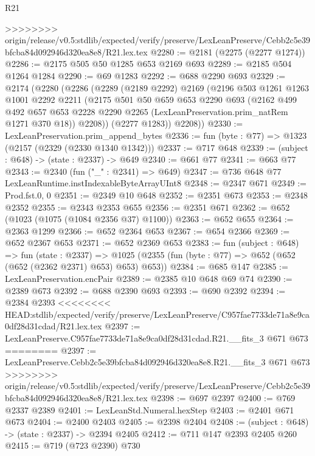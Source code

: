 \begin{lexlean}{R21}
\begin{coremodule}
{{{{{{{{{{{{{{{>>>>>>>> origin/release/v0.5:stdlib/expected/verify/preserve/LexLeanPreserve/Cebb2c5e39bfcba84d092946d320ea8e8/R21.lex.tex
@2280 := @2181 (@2275 (@2277 @1274))
@2286 := @2175 @505 @50 @1285 @653 @2169 @693
@2289 := @2185 @504 @1264 @1284
@2290 := @69 @1283
@2292 := @688 @2290 @693
@2329 := @2174
    (@2280
      (@2286
        (@2289
          (@2189 @2292)
          @2169
          (@2196
            @503
            @1261
            @1263
            @1001
            @2292
            @2211
            (@2175
              @501
              @50
              @659
              @653
              @2290
              @693
              (@2162
                @499
                @492
                @657
                @653
                @2228
                @2290
                @2265
                (LexLeanPreservation.prim_natRem @1271 @370 @18))
              @2208))
          (@2277 @1283))
        @2208))
@2330 := LexLeanPreservation.prim_append_bytes
@2336 := fun (byte : @77) => @1323 (@2157 (@2329 (@2330 @1340 @1342)))
@2337 := @717 @648
@2339 := (subject : @648) -> (state : @2337) -> @649
@2340 := @661 @77
@2341 := @663 @77
@2343 := @2340 (fun ("_" : @2341) => @649)
@2347 := @736 @648 @77 LexLeanRuntime.instIndexableByteArrayUInt8
@2348 := @2347 @671
@2349 := Prod.fst.{0, 0}
@2351 := @2349 @10 @648
@2352 := @2351 @673
@2353 := @2348 @2352
@2355 := @2343 @2353 @655
@2356 := @2351 @671
@2362 := @652 (@1023 (@1075 (@1084 @2356 @37) @1100))
@2363 := @652 @655
@2364 := @2363 @1299
@2366 := @652 @2364 @653
@2367 := @654 @2366
@2369 := @652 @2367 @653
@2371 := @652 @2369 @653
@2383 := fun (subject : @648) =>
  fun (state : @2337) =>
  @1025 (@2355 (fun (byte : @77) => @652 (@652 (@652 (@2362 @2371) @653) @653) @653))
@2384 := @685 @147
@2385 := LexLeanPreservation.encPair
@2389 := @2385 @10 @648 @69 @74
@2390 := @2389 @673
@2392 := @688 @2390 @693
@2393 := @690 @2392
@2394 := @2384 @2393
<<<<<<<< HEAD:stdlib/expected/verify/preserve/LexLeanPreserve/C957fae7733de71a8e9ca0df28d31cdad/R21.lex.tex
@2397 := LexLeanPreserve.C957fae7733de71a8e9ca0df28d31cdad.R21.__fits_3 @671 @673
========
@2397 := LexLeanPreserve.Cebb2c5e39bfcba84d092946d320ea8e8.R21.__fits_3 @671 @673
>>>>>>>> origin/release/v0.5:stdlib/expected/verify/preserve/LexLeanPreserve/Cebb2c5e39bfcba84d092946d320ea8e8/R21.lex.tex
@2398 := @697 @2397
@2400 := @769 @2337 @2389
@2401 := LexLeanStd.Numeral.hexStep
@2403 := @2401 @671 @673
@2404 := @2400 @2403
@2405 := @2398 @2404
@2408 := (subject : @648) -> (state : @2337) -> @2394 @2405
@2412 := @711 @147 @2393 @2405 @260
@2415 := @719 (@723 @2390) @730
}}}}}}}}}}}}}}}
\end{coremodule}
\end{lexlean}

